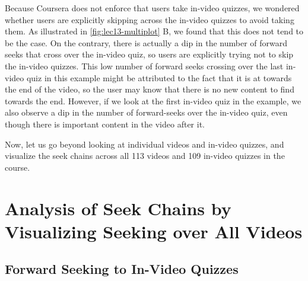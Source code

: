 \documentclass{sigchi}
\begin{document}
Because Coursera does not enforce that users take in-video quizzes, we wondered whether users are explicitly skipping across the in-video quizzes to avoid taking them. As illustrated in \autoref{fig:lec13-multiplot} B, we found that this does not tend to be the case. On the contrary, there is actually a dip in the number of forward seeks that cross over the in-video quiz, so users are explicitly trying not to skip the in-video quizzes. This low number of forward seeks crossing over the last in-video quiz in this example might be attributed to the fact that it is at towards the end of the video, so the user may know that there is no new content to find towards the end. However, if we look at the first in-video quiz in the example, we also observe a dip in the number of forward-seeks over the in-video quiz, even though there is important content in the video after it.


Now, let us go beyond looking at individual videos and in-video quizzes, and visualize the seek chains across all 113 videos and 109 in-video quizzes in the course.

\section{Analysis of Seek Chains by Visualizing Seeking over All Videos}

\subsection{Forward Seeking to In-Video Quizzes}
\end{document}
